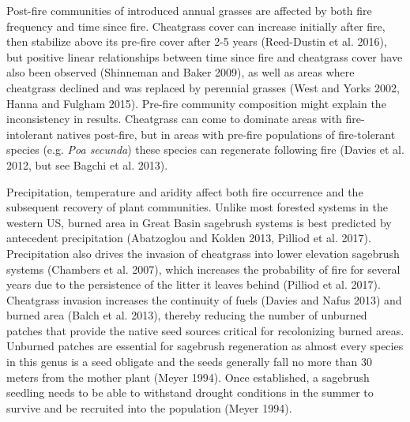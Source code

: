 \documentclass[12pt,]{article}
\begin{document}
Post-fire communities of introduced annual grasses are affected by both
fire frequency and time since fire. Cheatgrass cover can increase
initially after fire, then stabilize above its pre-fire cover after 2-5
years (Reed-Dustin et al. 2016), but positive linear relationships
between time since fire and cheatgrass cover have also been observed
(Shinneman and Baker 2009), as well as areas where cheatgrass declined
and was replaced by perennial grasses (West and Yorks 2002, Hanna and
Fulgham 2015). Pre-fire community composition might explain the
inconsistency in results. Cheatgrass can come to dominate areas with
fire-intolerant natives post-fire, but in areas with pre-fire
populations of fire-tolerant species (e.g. \emph{Poa secunda}) these
species can regenerate following fire (Davies et al. 2012, but see
Bagchi et al. 2013).

Precipitation, temperature and aridity affect both fire occurrence and
the subsequent recovery of plant communities. Unlike most forested
systems in the western US, burned area in Great Basin sagebrush systems
is best predicted by antecedent precipitation (Abatzoglou and Kolden
2013, Pilliod et al. 2017). Precipitation also drives the invasion of
cheatgrass into lower elevation sagebrush systems (Chambers et al.
2007), which increases the probability of fire for several years due to
the persistence of the litter it leaves behind (Pilliod et al. 2017).
Cheatgrass invasion increases the continuity of fuels (Davies and Nafus
2013) and burned area (Balch et al. 2013), thereby reducing the number
of unburned patches that provide the native seed sources critical for
recolonizing burned areas. Unburned patches are essential for sagebrush
regeneration as almost every species in this genus is a seed obligate
and the seeds generally fall no more than 30 meters from the mother
plant (Meyer 1994). Once established, a sagebrush seedling needs to be
able to withstand drought conditions in the summer to survive and be
recruited into the population (Meyer 1994).
\end{document}
